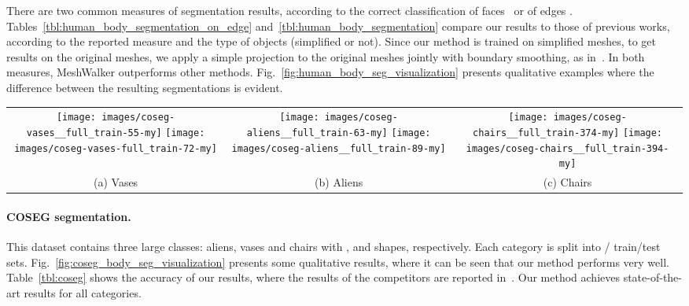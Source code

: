 \documentclass[acmtog]{acmart}
\begin{document}
There are two common measures of segmentation results, according to the correct classification of faces~\cite{haim2019surface} or of  edges \cite{hanocka2019meshcnn}.
Tables~\ref{tbl:human_body_segmentation_on_edge} and~\ref{tbl:human_body_segmentation} compare our results to those of previous works, according to the reported measure and the type of objects (simplified or not).
Since our method is trained on simplified meshes, to get results on the original meshes, we apply a simple projection to the original meshes jointly with boundary smoothing, as in~\cite{katz2003hierarchical}.
In both measures, MeshWalker outperforms other methods. 
Fig.~\ref{fig:human_body_seg_visualization} presents qualitative examples where the difference between the resulting segmentations is evident.






\begin{figure*}[htb]
\centering
\begin{tabular}{ccc}
\texttt{[image: images/coseg-vases\_\_full\_train-55-my]}
\texttt{[image: images/coseg-vases-full\_train-72-my]}&
\texttt{[image: images/coseg-aliens\_\_full\_train-63-my]}
\texttt{[image: images/coseg-aliens\_\_full\_train-89-my]}&
\texttt{[image: images/coseg-chairs\_\_full\_train-374-my]}
\texttt{[image: images/coseg-chairs\_\_full\_train-394-my]}\\
(a) Vases & (b) Aliens & (c) Chairs 
\end{tabular}
\caption{{\bf Qualitative results of segmentation for meshes from COSEG~\cite{wang2012active}.} 
} 
\label{fig:coseg_body_seg_visualization}
\end{figure*}


\paragraph{COSEG segmentation.}
This dataset contains three large classes: aliens, vases and chairs with ,  and  shapes,
respectively. 
Each category is split into / train/test sets.
Fig.~\ref{fig:coseg_body_seg_visualization} presents some qualitative results, where it can be seen that our method performs very well.
Table~\ref{tbl:coseg} shows the accuracy of our results, where the results of the competitors are reported in~\cite{hanocka2019meshcnn}.
Our method achieves state-of-the-art results for all categories.
\end{document}
